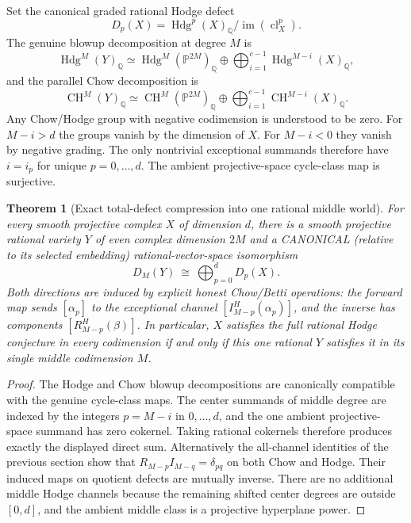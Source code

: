 \documentclass[11pt]{article}
\newcommand{\Q}{\mathbb Q}
\newcommand{\CH}{\operatorname{CH}}
\newcommand{\Hdg}{\operatorname{Hdg}}
\newcommand{\cl}{\operatorname{cl}}
\newtheorem{theorem}{Theorem}
\begin{document}
Set the canonical graded rational Hodge defect
\[
 D_p(X)=\Hdg^p(X)_{\Q}/\operatorname{im}(\cl_X^p).
\]
The genuine blowup decomposition at degree $M$ is
\[
 \Hdg^M(Y)_{\Q}\simeq
 \Hdg^M(\mathbb P^{2M})_{\Q}
 \oplus\bigoplus_{i=1}^{c-1}\Hdg^{M-i}(X)_{\Q},
\]
and the parallel Chow decomposition is
\[
 \CH^M(Y)_{\Q}\simeq
 \CH^M(\mathbb P^{2M})_{\Q}
 \oplus\bigoplus_{i=1}^{c-1}\CH^{M-i}(X)_{\Q}.
\]
Any Chow/Hodge group with negative codimension is understood to be zero.
For $M-i>d$ the groups vanish by the dimension of $X$.
For $M-i<0$ they vanish by negative grading.
The only nontrivial exceptional summands therefore have
$i=i_p$ for unique $p=0,\ldots,d$.
The ambient projective-space cycle-class map is surjective.

\begin{theorem}[Exact total-defect compression into one rational middle world]
For every smooth projective complex $X$ of dimension $d$, there
is a smooth projective rational variety $Y$ of even complex
dimension $2M$ and a CANONICAL (relative to its selected embedding)
rational-vector-space isomorphism
\[
 \boxed{
 D_M(Y)\ \cong\ \bigoplus_{p=0}^{d}D_p(X).}
 \tag{5.1}
\]
Both directions are induced by explicit honest Chow/Betti operations:
the forward map sends $[\alpha_p]$ to the exceptional channel
$[I_{M-p}^{H}(\alpha_p)]$, and the inverse has components
$[R_{M-p}^{H}(\beta)]$.
In particular, $X$ satisfies the full rational Hodge conjecture
in \emph{every} codimension if and only if this one rational $Y$
satisfies it in its \emph{single middle codimension} $M$.
\end{theorem}
\begin{proof}
The Hodge and Chow blowup decompositions are canonically
compatible with the genuine cycle-class maps. The center
summands of middle degree are indexed by the integers
$p=M-i$ in $0,\dots,d$, and the one ambient projective-space
summand has zero cokernel. Taking rational cokernels therefore
produces exactly the displayed direct sum.
Alternatively the all-channel identities of the previous section
show that $R_{M-p}I_{M-q}=\delta_{pq}$ on both Chow and Hodge.
Their induced maps on quotient defects are mutually inverse.
There are no additional middle Hodge channels because the
remaining shifted center degrees are outside $[0,d]$,
and the ambient middle class is a projective hyperplane power.
\end{proof}
\end{document}
